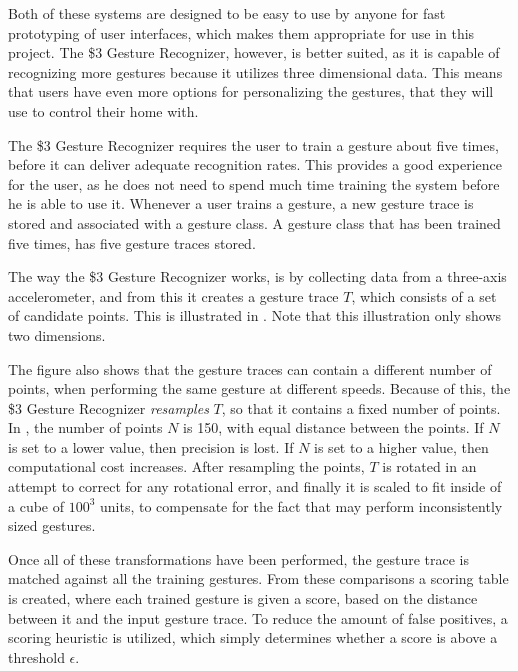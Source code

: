 Both of these systems are designed to be easy to use by anyone for fast prototyping of user interfaces, 
which makes them appropriate for use in this project.
The \$3 Gesture Recognizer, however, is better suited, 
as it is capable of recognizing more gestures because it utilizes three dimensional data.
This means that users have even more options for personalizing the gestures, 
that they will use to control their home with.

The \$3 Gesture Recognizer requires the user to train a gesture about five times, 
before it can deliver adequate recognition rates. 
This provides a good experience for the user, 
as he does not need to spend much time training the system before he is able to use it.
Whenever a user trains a gesture, 
a new gesture trace is stored and associated with a gesture class. 
A gesture class that has been trained five times, 
has five gesture traces stored.

The way the \$3 Gesture Recognizer works, 
is by collecting data from a three-axis accelerometer, 
and from this it creates a gesture trace $T$, 
which consists of a set of candidate points. 
This is illustrated in . 
Note that this illustration only shows two dimensions. 

The figure also shows that the gesture traces can contain a different number of points, 
when performing the same gesture at different speeds.
Because of this, the \$3 Gesture Recognizer \emph{resamples} $T$, 
so that it contains a fixed number of points. 
In \cite{threedollar}, the number of points $N$ is \num{150}, 
with equal distance between the points.
If $N$ is set to a lower value, then precision is lost. 
If $N$ is set to a higher value, then computational cost increases.
After resampling the points, 
$T$ is rotated in an attempt to correct for any rotational error, 
and finally it is scaled to fit inside of a cube of $100^3$ units, 
to compensate for the fact that may perform inconsistently sized gestures.

Once all of these transformations have been performed, 
the gesture trace is matched against all the training gestures. 
From these comparisons a scoring table is created, 
where each trained gesture is given a score, 
based on the distance between it and the input gesture trace. 
To reduce the amount of false positives, 
a scoring heuristic is utilized, 
which simply determines whether a score is above a threshold $\epsilon$.


